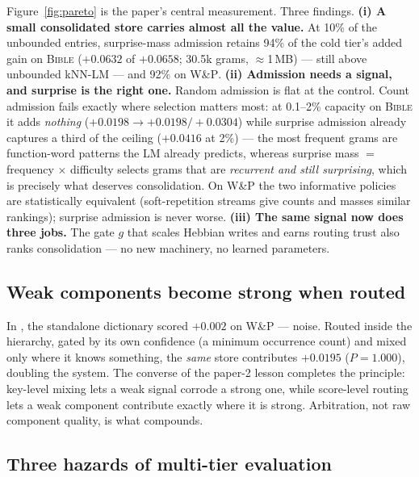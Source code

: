 \documentclass[11pt]{article}
\begin{document}
Figure~\ref{fig:pareto} is the paper's central measurement. Three findings.
\textbf{(i) A small consolidated store carries almost all the value.} At 10\% of the unbounded entries, surprise-mass admission retains 94\% of the cold tier's added gain on \textsc{Bible} ($+0.0632$ of $+0.0658$; 30.5k grams, $\approx$1\,MB) --- still above unbounded kNN-LM --- and 92\% on \textsc{W\&P}.
\textbf{(ii) Admission needs a signal, and surprise is the right one.} Random admission is flat at the control. Count admission fails exactly where selection matters most: at 0.1--2\% capacity on \textsc{Bible} it adds \emph{nothing} ($+0.0198 \to +0.0198/+0.0304$) while surprise admission already captures a third of the ceiling ($+0.0416$ at 2\%) --- the most frequent grams are function-word patterns the LM already predicts, whereas surprise mass $=$ frequency $\times$ difficulty selects grams that are \emph{recurrent and still surprising}, which is precisely what deserves consolidation. On \textsc{W\&P} the two informative policies are statistically equivalent (soft-repetition streams give counts and masses similar rankings); surprise admission is never worse.
\textbf{(iii) The same signal now does three jobs.} The gate $g$ that scales Hebbian writes \cite{sillage} and earns routing trust \cite{router} also ranks consolidation --- no new machinery, no learned parameters.

\subsection{Weak components become strong when routed}\label{sec:weak}

In \cite{sillage}, the standalone dictionary scored $+0.002$ on \textsc{W\&P} --- noise. Routed inside the hierarchy, gated by its own confidence (a minimum occurrence count) and mixed only where it knows something, the \emph{same} store contributes $+0.0195$ ($P = 1.000$), doubling the system. The converse of the paper-2 lesson completes the principle: key-level mixing lets a weak signal corrode a strong one, while score-level routing lets a weak component contribute exactly where it is strong. Arbitration, not raw component quality, is what compounds.

\subsection{Three hazards of multi-tier evaluation}\label{sec:hazards}
\end{document}

